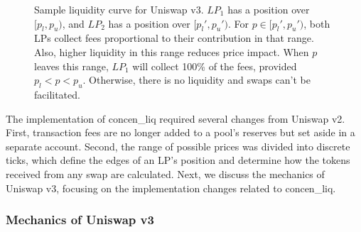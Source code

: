 \documentclass[11pt]{article}
\begin{document}
\vspace{1cm}
\begin{figure}[H]
    \centering
    \vspace{0.5cm}
    \caption{Sample liquidity curve for Uniswap v3. $LP_1$ has a position over $[p_l, p_u)$, and $LP_2$ has a position over $[p_l', p_u')$. For $p \in [p_l', p_u')$, both LPs collect fees proportional to their contribution in that range. Also, higher liquidity in this range reduces price impact. When $p$ leaves this range, $LP_1$ will collect 100\% of the fees, provided $p_l < p < p_u$. Otherwise, there is no liquidity and swaps can't be facilitated.}
    \label{fig:uniswap_v3_sample_liq_curve}
\end{figure}

The implementation of \gls{concen_liq} required several changes from Uniswap v2. First, transaction fees are no longer added to a pool's reserves but set aside in a separate account. Second, the range of possible prices was divided into discrete ticks, which define the edges of an LP's position and determine how the tokens received from any swap are calculated. Next, we discuss the mechanics of Uniswap v3, focusing on the implementation changes related to \gls{concen_liq}.

\subsubsection{Mechanics of Uniswap v3}
\end{document}
